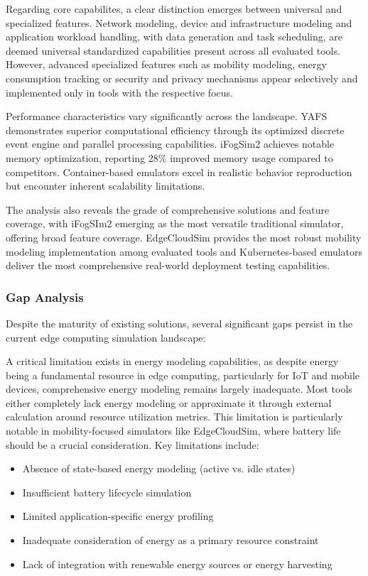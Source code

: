 Regarding core capabilites, a clear distinction emerges between universal and specialized features.
Network modeling, device and infrastructure modeling and application workload handling, with data generation and task scheduling, are deemed universal standardized capabilities present across all evaluated tools.
However, advanced specialized features such as mobility modeling, energy consumption tracking or security and privacy mechanisms appear selectively and implemented only in tools with the respective focus.

Performance characteristics vary significantly across the landscape.
YAFS demonstrates superior computational efficiency through its optimized discrete event engine and parallel processing capabilities.
iFogSim2 achieves notable memory optimization, reporting 28\% improved memory usage compared to competitors.
Container-based emulators excel in realistic behavior reproduction but encounter inherent scalability limitations.

The analysis also reveals the grade of comprehensive solutions and feature coverage, with iFogSIm2 emerging as the most versatile traditional simulator, offering broad feature coverage.
EdgeCloudSim provides the most robust mobility modeling implementation among evaluated tools and Kubernetes-based emulators deliver the most comprehensive real-world deployment testing capabilities.

\subsubsection{Gap Analysis}
Despite the maturity of existing solutions, several significant gaps persist in the current edge computing simulation landscape:

A critical limitation exists in energy modeling capabilities, as despite energy being a fundamental resource in edge computing, particularly for IoT and mobile devices, comprehensive energy modeling remains largely inadequate.
Most tools either completely lack energy modeling or approximate it through external calculation around resource utilization metrics.
This limitation is particularly notable in mobility-focused simulators like EdgeCloudSim, where battery life should be a crucial consideration.
Key limitations include:
\begin{itemize}
    \item Absence of state-based energy modeling (active vs. idle states)
    \item Insufficient battery lifecycle simulation
    \item Limited application-specific energy profiling
    \item Inadequate consideration of energy as a primary resource constraint
    \item Lack of integration with renewable energy sources or energy harvesting
\end{itemize}

